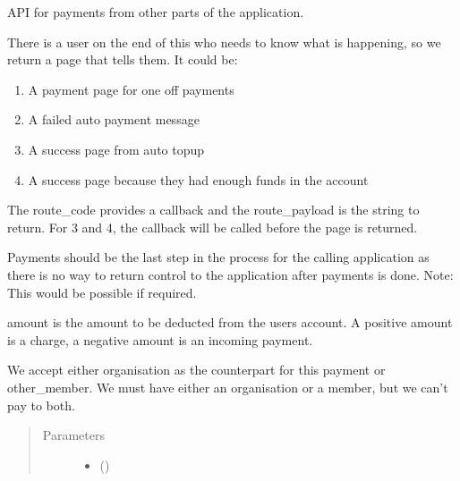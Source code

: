 \documentclass[letterpaper,10pt,english]{sphinxmanual}
\begin{document}

\begin{fulllineitems}
\label{\detokenize{payments:payments.core.payment_api}}
API for payments from other parts of the application.

There is a user on the end of this who needs to know what is happening,
so we return a page that tells them. It could be:
\begin{enumerate}
%
\item {} 
A payment page for one off payments

\item {} 
A failed auto payment message

\item {} 
A success page from auto topup

\item {} 
A success page because they had enough funds in the account

\end{enumerate}

The route\_code provides a callback and the route\_payload is the string
to return. For 3 and 4, the callback will be called before the page is
returned.

Payments should be the last step in the process for the calling application
as there is no way to return control to the application after payments is
done. Note: This would be possible if required.

amount is the amount to be deducted from the users account. A positive
amount is a charge, a negative amount is an incoming payment.

We accept either organisation as the counterpart for this payment or
other\_member. We must have either an organisation or a member, but
we can’t pay to both.
\begin{quote}\begin{description}
\item[{Parameters}] \leavevmode\begin{itemize}
\item {} 
 () \textendash{} 


\end{itemize}
\end{description}
\end{quote}
\end{fulllineitems}
\end{document}
